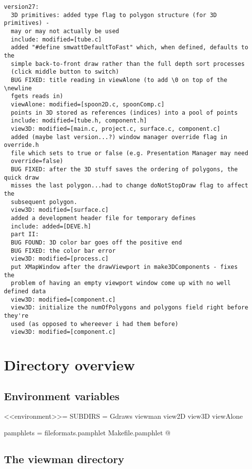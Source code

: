 \documentclass{article}
\begin{document}
\begin{verbatim}
version27:
  3D primitives: added type flag to polygon structure (for 3D primitives) -
  may or may not actually be used
  include: modified=[tube.c]
  added "#define smwattDefaultToFast" which, when defined, defaults to the
  simple back-to-front draw rather than the full depth sort processes
  (click middle button to switch)
  BUG FIXED: title reading in viewAlone (to add \0 on top of the \newline
  fgets reads in)
  viewAlone: modified=[spoon2D.c, spoonComp.c]
  points in 3D stored as references (indices) into a pool of points
  include: modified=[tube.h, component.h]
  view3D: modified=[main.c, project.c, surface.c, component.c]
  added (maybe last version...?) window manager override flag in override.h
  file which sets to true or false (e.g. Presentation Manager may need
  override=false)
  BUG FIXED: after the 3D stuff saves the ordering of polygons, the quick draw
  misses the last polygon...had to change doNotStopDraw flag to affect the
  subsequent polygon.
  view3D: modified=[surface.c]
  added a development header file for temporary defines
  include: added=[DEVE.h]
  part II:
  BUG FOUND: 3D color bar goes off the positive end
  BUG FIXED: the color bar error
  view3D: modified=[process.c]
  put XMapWindow after the drawViewport in make3DComponents - fixes the
  problem of having an empty viewport window come up with no well defined data
  view3D: modified=[component.c]
  view3D: initialize the numOfPolygons and polygons field right before they're
  used (as opposed to whereever i had them before)
  view3D: modified=[component.c]
\end{verbatim}

\section{Directory overview}

\subsection{Environment variables}

<<environment>>=
SUBDIRS = Gdraws viewman view2D view3D viewAlone

pamphlets = fileformats.pamphlet Makefile.pamphlet
@

\subsection{The viewman directory}
\end{document}
